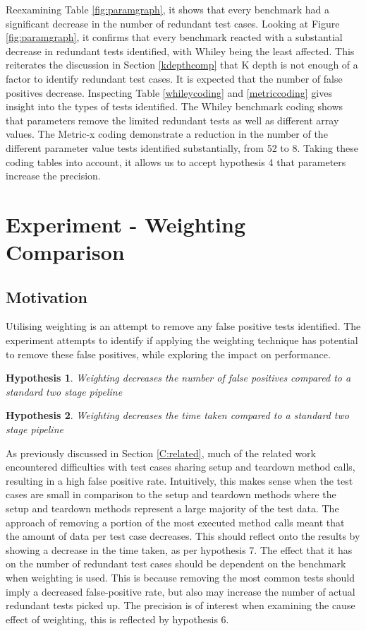 \documentclass[11pt
              , a4paper
              , twoside
              , openright
              ]{report}
\newcommand{\rom}[1]{\uppercase\expandafter{\romannumeral #1\relax}}
\newtheorem{hyp}{Hypothesis}
\begin{document}
Reexamining Table \ref{fig:paramgraph}, it shows that every benchmark had a significant decrease in the number of redundant test cases. Looking at Figure \ref{fig:paramgraph}, it confirms that every benchmark reacted with a substantial decrease in redundant tests identified, with Whiley being the least affected. This reiterates the discussion in Section \ref{kdepthcomp} that K depth is not enough of a factor to identify redundant test cases. It is expected that the number of false positives decrease. Inspecting Table \ref{whileycoding} and \ref{metriccoding} gives insight into the types of tests identified. The Whiley benchmark coding shows that parameters remove the limited redundant tests as well as different array values. The Metric-x coding demonstrate a reduction in the number of the different parameter value tests identified substantially, from 52 to 8. Taking these coding tables into account, it allows us to accept hypothesis 4 that parameters increase the precision.

\section{Experiment \rom{4} - Weighting Comparison}
\label{sec:weight}

\subsection{Motivation}
Utilising weighting is an attempt to remove any false positive tests identified. The experiment attempts to identify if applying the weighting technique has potential to remove these false positives, while exploring the impact on performance.

\begin{hyp}
Weighting decreases the number of false positives compared to a standard two stage pipeline
\end{hyp}

\begin{hyp}
Weighting decreases the time taken compared to a standard two stage pipeline
\end{hyp}

As previously discussed in Section \ref{C:related}, much of the related work encountered difficulties with test cases sharing setup and teardown method calls, resulting in a high false positive rate. Intuitively, this makes sense when the test cases are small in comparison to the setup and teardown methods where the setup and teardown methods represent a large majority of the test data. The approach of removing a portion of the most executed method calls meant that the amount of data per test case decreases. This should reflect onto the results by showing a decrease in the time taken, as per hypothesis 7. The effect that it has on the number of redundant test cases should be dependent on the benchmark when weighting is used. This is because removing the most common tests should imply a decreased false-positive rate, but also may increase the number of actual redundant tests picked up. The precision is of interest when examining the cause effect of weighting, this is reflected by hypothesis 6.
\end{document}
